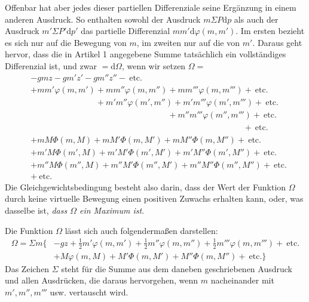 Offenbar hat aber jedes dieser partiellen Differenziale seine Ergänzung in einem anderen Ausdruck. So enthalten sowohl der Ausdruck $m\Sigma P\mathrm{d}p$ als auch der Ausdruck $m'\Sigma P'\mathrm{d}p'$ das partielle Differenzial $mm'\mathrm{d}\varphi(m,m')$. Im ersten bezieht es sich nur auf die Bewegung von $m$, im zweiten nur auf die von $m'$. Daraus geht hervor, dass die in Artikel 1 angegebene Summe tatsächlich ein vollständiges Differenzial ist, und zwar $=\mathrm{d}\Omega$, wenn wir setzen $\Omega=$
\[
\begin{aligned}
&-gmz-gm'z'-gm''z''-\ \text{etc.}\\
&+mm'\varphi(m,m')+mm''\varphi(m,m'')+mm'''\varphi(m,m''')+\ \text{etc.}\\
&\phantom{+mm'\varphi(m,m')}+m'm''\varphi(m',m'')+m'm'''\varphi(m',m''')+\ \text{etc.}\\
&\phantom{+mm'\varphi(m,m')+mm''\varphi(m,m'')}+m''m'''\varphi(m'',m''')+\ \text{etc.}\\
&\phantom{+mm'\varphi(m,m')+mm''\varphi(m,m'')+mm'''\varphi(m,m''')}+\ \text{etc.}\\
&+mM\Phi(m,M)+mM'\Phi(m,M')+mM''\Phi(m,M'')+\ \text{etc.}\\
&+m'M\Phi(m',M)+m'M'\Phi(m',M')+m'M''\Phi(m',M'')+\ \text{etc.}\\
&+m''M\Phi(m'',M)+m''M'\Phi(m'',M')+m''M''\Phi(m'',M'')+\ \text{etc.}\\
&+\ \text{etc.}
\end{aligned}
\]
Die Gleichgewichtsbedingung besteht also darin, dass der Wert der Funktion $\Omega$ durch keine virtuelle Bewegung einen positiven Zuwachs erhalten kann, oder, was dasselbe ist, \textit{dass $\Omega$ ein Maximum ist}.

Die Funktion $\Omega$ lässt sich auch folgendermaßen darstellen:
\[
\begin{aligned}
\Omega=\Sigma m\{&-gz+\tfrac12m'\varphi(m,m')+\tfrac12m''\varphi(m,m'')+\tfrac12m'''\varphi(m,m''')+\ \text{etc.}\\
&+M\varphi(m,M)+M'\Phi(m,M')+M''\Phi(m,M'')+\ \text{etc.}\}
\end{aligned}
\]
Das Zeichen $\Sigma$ steht für die Summe aus dem daneben geschriebenen Ausdruck und allen Ausdrücken, die daraus hervorgehen, wenn $m$ nacheinander mit $m',m'',m'''$ usw. vertauscht wird.

